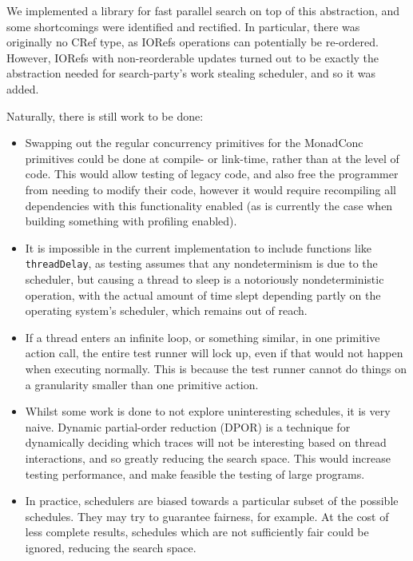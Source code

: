 We implemented a library for fast parallel search on top of this
abstraction, and some shortcomings were identified and rectified. In
particular, there was originally no CRef type, as IORefs operations
can potentially be re-ordered\cite{ioref}. However, IORefs with
non-reorderable updates turned out to be exactly the abstraction
needed for search-party's work stealing scheduler, and so it was
added.

Naturally, there is still work to be done:

\begin{itemize}
  \item Swapping out the regular concurrency primitives for the
    MonadConc primitives could be done at compile- or link-time, rather
    than at the level of code. This would allow testing of legacy code,
    and also free the programmer from needing to modify their code,
    however it would require recompiling all dependencies with this
    functionality enabled (as is currently the case when building
    something with profiling enabled).

  \item It is impossible in the current implementation to include
    functions like \texttt{threadDelay}, as testing assumes that any
    nondeterminism is due to the scheduler, but causing a thread to
    sleep is a notoriously nondeterministic operation, with the actual
    amount of time slept depending partly on the operating system's
    scheduler, which remains out of reach.

  \item If a thread enters an infinite loop, or something similar, in
    one primitive action call, the entire test runner will lock up,
    even if that would not happen when executing normally. This is
    because the test runner cannot do things on a granularity smaller
    than one primitive action.

  \item Whilst some work is done to not explore uninteresting
    schedules, it is very naive. Dynamic partial-order reduction
    (DPOR)\cite{dpor} is a technique for dynamically deciding which
    traces will not be interesting based on thread interactions, and
    so greatly reducing the search space. This would increase testing
    performance, and make feasible the testing of large programs.

  \item In practice, schedulers are biased towards a particular subset
    of the possible schedules. They may try to guarantee fairness, for
    example. At the cost of less complete results, schedules which are
    not sufficiently fair could be ignored, reducing the search space.
\end{itemize}

